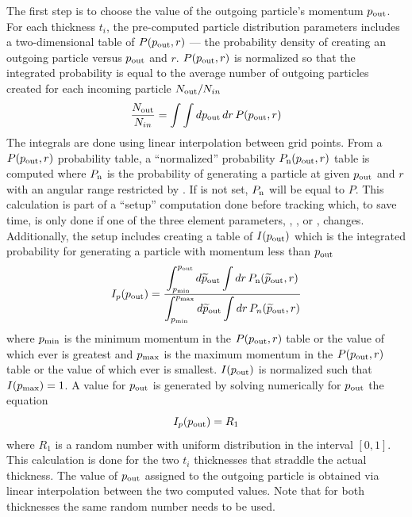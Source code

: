 The first step is to choose the value of the outgoing particle's momentum $p_{\text{out}}$. For each
thickness $t_i$, the pre-computed particle distribution parameters includes a two-dimensional table
of $P(p_{\text{out}}, r)$ --- the probability density of creating an outgoing particle versus
$p_{\text{out}}$ and $r$. $P(p_{\text{out}},r)$ is normalized so that the integrated probability is equal
to the average number of outgoing particles created for each incoming particle $N_{\text{out}}/N_{in}$
\begin{equation}
  \frac{N_{\text{out}}}{N_{in}} = \int \int dp_{\text{out}} \, dr \, P(p_{\text{out}}, r)
\end{equation}
The integrals are done using linear interpolation between grid points.  From a $P(p_{\text{out}},r)$
probability table, a ``normalized'' probability $P_{\text{n}}(p_{\text{out}},r)$ table is computed where
$P_{\text{n}}$ is the probability of generating a particle at given $p_{\text{out}}$ and $r$ with an
angular range restricted by . If  is not set, $P_{\text{n}}$ will
be equal to $P$.  This calculation is part of a ``setup'' computation done before tracking which, to
save time, is only done if one of the three element parameters, , , or
, changes. Additionally, the setup includes creating a table of $I(p_{\text{out}})$
which is the integrated probability for generating a particle with momentum less than $p_{\text{out}}$
\begin{equation}
  I_p(p_{\text{out}}) = \frac{\displaystyle \int_{p_{\text{min}}}^{p_{\text{out}}} d{\widetilde p}_{\text{out}} 
  \int dr \, P_{\text{n}}({\widetilde p}_{\text{out}}, r)}
  {\displaystyle \int_{p_{\text{min}}}^{p_{\text{max}}} d{\widetilde p}_{\text{out}} \int dr \, P_{n}({\widetilde p}_{\text{out}}, r)}
\end{equation}
where $p_{\text{min}}$ is the minimum momentum in the $P(p_{\text{out}}, r)$ table or the value of
 which ever is greatest and $p_{\text{max}}$ is the maximum momentum in the
$P(p_{\text{out}}, r)$ table or the value of  which ever is smallest. $I(p_{\text{out}})$
is normalized such that $I(p_{\text{max}}) = 1$. A value for $p_{\text{out}}$ is generated by solving
numerically for $p_{\text{out}}$ the equation
\begin{equation}
  I_p(p_{\text{out}}) = R_1
\end{equation}
where $R_1$ is a random number with uniform distribution in the interval $[0,1]$.  This
calculation is done for the two $t_i$ thicknesses that straddle the actual thickness. The value of
$p_{\text{out}}$ assigned to the outgoing particle is obtained via linear interpolation between the two
computed values. Note that for both thicknesses the same random number needs to be used.

